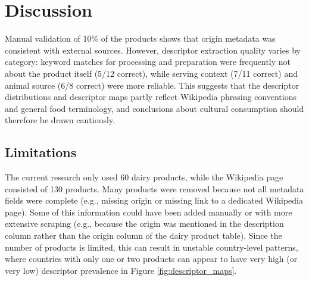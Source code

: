 \documentclass[sigconf]{acmart-txmm}
\begin{document}
\section{Discussion}

Manual validation of 10\% of the products shows that origin metadata was consistent with external sources.
However, descriptor extraction quality varies by category: keyword matches for processing and preparation were frequently not about the product itself (5/12 correct), while serving context (7/11 correct) and animal source (6/8 correct) were more reliable.
This suggests that the descriptor distributions and descriptor maps partly reflect Wikipedia phrasing conventions and general food terminology, and conclusions about cultural consumption should therefore be drawn cautiously.

\subsection{Limitations}
The current research only used 60 dairy products, while the Wikipedia page consisted of 130 products. 
Many products were removed because not all metadata fields were complete (e.g., missing origin or missing link to a dedicated Wikipedia page).
Some of this information could have been added manually or with more extensive scraping (e.g., because the origin was mentioned in the description column rather than the origin column of the dairy product table).
Since the number of products is limited, this can result in unstable country-level patterns, where countries with only one or two products can appear to have very high (or very low) descriptor prevalence in Figure \ref{fig:descriptor_maps}.
\end{document}
